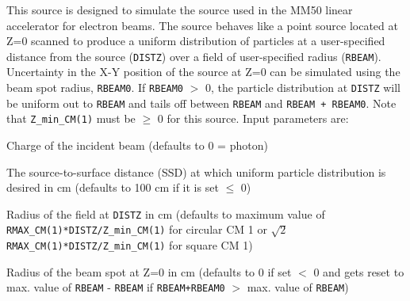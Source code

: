 \documentclass[12pt,twoside]{article}
\begin{document}
This source is designed to simulate the source used in the MM50 linear
accelerator for electron beams.
The source behaves like a point source
located at Z=0 scanned to produce a uniform distribution of particles at
a user-specified distance from the source ({\tt DISTZ}) over a field
of user-specified radius ({\tt RBEAM}).  Uncertainty in the X-Y position
of the source at Z=0 can be simulated using the beam spot radius, {\tt RBEAM0}.
If {\tt RBEAM0} $>$ 0,
the particle distribution at {\tt DISTZ}
will be uniform out to {\tt RBEAM} and tails off between
{\tt RBEAM} and {\tt RBEAM + RBEAM0}.
Note that \verb+Z_min_CM(1)+ must be $\geq$ 0 for this source.
Input parameters are:
\begin{description}
\item [IQIN] Charge of the incident beam (defaults to 0 = photon)
\item [DISTZ] The source-to-surface distance (SSD) at which uniform
particle distribution is desired in cm (defaults to 100 cm if it is set $\leq$ 0)
\item [RBEAM] Radius of the field at \verb+DISTZ+ in cm (defaults to maximum
value of \\
{\tt RMAX\_CM(1)*DISTZ/Z\_min\_CM(1)} for circular CM 1 or
$\sqrt{2}${\tt RMAX\_CM(1)*DISTZ/Z\_min\_CM(1)} for square CM 1)
\item [RBEAM0] Radius of the beam spot at Z=0 in cm (defaults to 0 if
set $<$ 0 and gets reset to
max. value of {\tt RBEAM} - {\tt RBEAM} if
{\tt RBEAM+RBEAM0} $>$ max. value of {\tt RBEAM})
\end{description}
\vspace*{-0.5cm}
\end{document}

